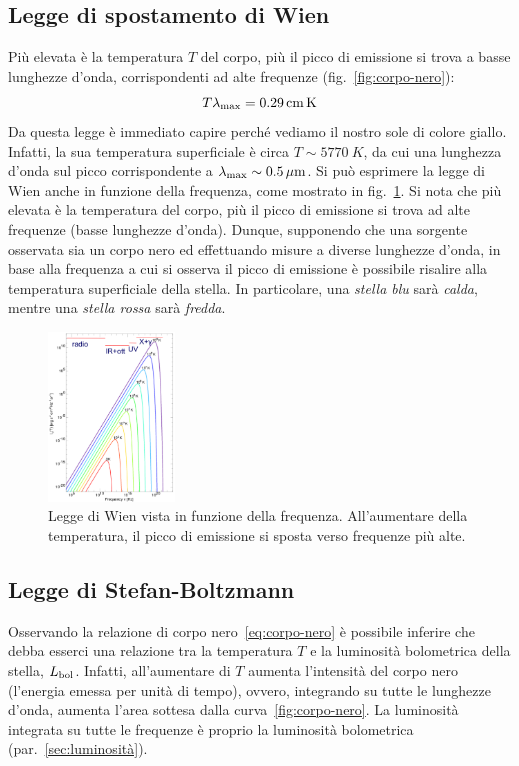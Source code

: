 \subsection{Legge di spostamento di Wien}\label{sec:legge-wien}
Più elevata è la temperatura $T$ del corpo, più il picco di emissione si trova a basse lunghezze d'onda, corrispondenti ad alte frequenze (fig.~\ref{fig:corpo-nero}):
\begin{equation}\label{eq:legge-wien}
    T \lambda_\textup{max} = \SI{0.29}{cm.K}
\end{equation}
Da questa legge è immediato capire perché vediamo il nostro sole di colore giallo. Infatti, la sua temperatura superficiale è circa $T \sim \SI{5770}{K}$, da cui una lunghezza d'onda sul picco corrispondente a $\lambda_\textup{max} \sim \SI{0.5}{\mu m}$. Si può esprimere la legge di Wien anche in funzione della frequenza, come mostrato in fig.~\ref{fig:legge-wien}. Si nota che più elevata è la temperatura del corpo, più il picco di emissione si trova ad alte frequenze (basse lunghezze d'onda). Dunque, supponendo che una sorgente osservata sia un corpo nero ed effettuando misure a diverse lunghezze d'onda, in base alla frequenza a cui si osserva il picco di emissione è possibile risalire alla temperatura superficiale della stella. In particolare, una \emph{stella blu} sarà \emph{calda}, mentre una \emph{stella rossa} sarà \emph{fredda}.

\begin{figure}
\centering
\includegraphics[width=0.3\textwidth]{immagini/legge-wien.png}
\caption{Legge di Wien vista in funzione della frequenza. All'aumentare della temperatura, il picco di emissione si sposta verso frequenze più alte.}
\label{fig:legge-wien}
\end{figure}

\subsection{Legge di Stefan-Boltzmann}\label{sec:legge-stefan-boltzmann}
Osservando la relazione di corpo nero~\eqref{eq:corpo-nero} è possibile inferire che debba esserci una relazione tra la temperatura $T$ e la luminosità bolometrica della stella, $L_\textup{bol}$. Infatti, all'aumentare di $T$ aumenta l'intensità del corpo nero (l'energia emessa per unità di tempo), ovvero, integrando su tutte le lunghezze d'onda, aumenta l'area sottesa dalla curva~\ref{fig:corpo-nero}. La luminosità integrata su tutte le frequenze è proprio la luminosità bolometrica (par.~\ref{sec:luminosità}).

